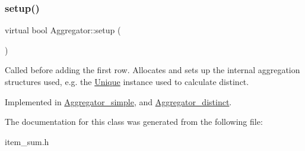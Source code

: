 \mbox{\label{classAggregator_afcde359558a43054f7812a72498a263f}} 
\subsubsection{\texorpdfstring{setup()}{setup()}}
{\footnotesize\ttfamily virtual bool Aggregator\+::setup (\begin{DoxyParamCaption}\item[{T\+HD $\ast$}]{ }\end{DoxyParamCaption})\hspace{0.3cm}{\ttfamily [pure virtual]}}

Called before adding the first row. Allocates and sets up the internal aggregation structures used, e.\+g. the \mbox{\hyperlink{classUnique}{Unique}} instance used to calculate distinct. 

Implemented in \mbox{\hyperlink{classAggregator__simple_a5ba27dcd45b797485c888a36a5cc4bd3}{Aggregator\+\_\+simple}}, and \mbox{\hyperlink{classAggregator__distinct_ac01d658918e5e160779ccfaf1134943b}{Aggregator\+\_\+distinct}}.



The documentation for this class was generated from the following file\+:\begin{DoxyCompactItemize}
\item 
item\+\_\+sum.\+h\end{DoxyCompactItemize}
